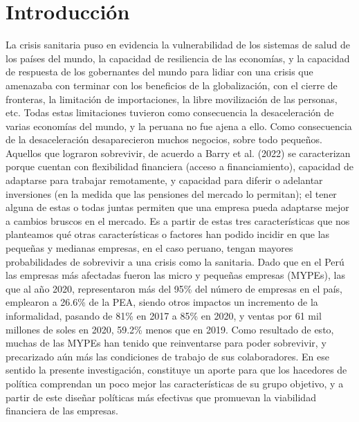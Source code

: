 \documentclass[12pt]{article}
\begin{document}
        \section{Introducción}
        {\Huge L}a crisis sanitaria puso en evidencia la vulnerabilidad de los sistemas de salud de los países
        del mundo, la capacidad de resiliencia de las economías, y la capacidad de respuesta de los gobernantes
        del mundo para lidiar con una crisis que amenazaba con terminar con los beneficios de la globalización,
        con el cierre de fronteras, la limitación de importaciones, la libre movilización de las personas, etc.
        Todas estas limitaciones tuvieron como consecuencia la desaceleración de varias economías del mundo, y la
        peruana no fue ajena a ello. Como consecuencia de la desaceleración desaparecieron muchos negocios, sobre
        todo pequeños. Aquellos que lograron sobrevivir, de acuerdo a Barry et al. (2022) se caracterizan porque cuentan
        con flexibilidad financiera (acceso a financiamiento), capacidad de adaptarse para trabajar remotamente,
        y capacidad para diferir o adelantar inversiones (en la medida que las pensiones del mercado lo permitan);
        el tener alguna de estas o todas juntas permiten que una empresa pueda adaptarse mejor a cambios bruscos en
        el mercado. Es a partir de estas tres características que nos planteamos qué otras características o factores
        han podido incidir en que las pequeñas y medianas empresas, en el caso peruano, tengan mayores probabilidades
        de sobrevivir a una crisis como la sanitaria. Dado que en el Perú las empresas más afectadas fueron las micro y
        pequeñas empresas (MYPEs), las que al año 2020, representaron más del 95\% del número de empresas en el país,
        emplearon a 26.6\% de la PEA, siendo otros impactos un incremento de la informalidad, pasando de 81\% en 2017
        a 85\% en 2020, y ventas por 61 mil millones de soles en 2020, 59.2\% menos que en 2019. Como resultado de
        esto, muchas de las MYPEs han tenido que reinventarse para poder sobrevivir, y precarizado aún más las
        condiciones de trabajo de sus colaboradores. En ese sentido la presente investigación, constituye un aporte
        para que los hacedores de política comprendan un poco mejor las características de su grupo objetivo, y a partir
        de este diseñar políticas más efectivas que promuevan la viabilidad financiera de las empresas.
\end{document}
